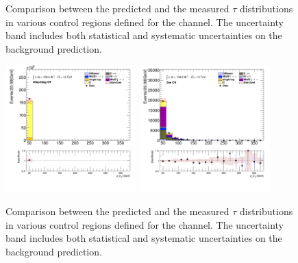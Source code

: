 \begin{figure}[!thp]
\begin{center}
			\end{center}
			\caption{
			Comparison between the predicted and the measured $\tau$ \pt distributions in various control regions defined for the \taulep channel. The uncertainty band includes both statistical and systematic uncertainties on the background prediction. 
			}
			\label{fig:bkg-tau-pt-taulep-1}
		\end{figure}

		\begin{figure}[!thp]
			\begin{center}    
			\includegraphics[width=0.45\textwidth]{chapters/chapter6_HPlus/images/taulep/tau_0_pt_DILEP_BTAG.png}
			\includegraphics[width=0.45\textwidth]{chapters/chapter6_HPlus/images/taulep/tau_0_pt_ZEE.png} \\
			\end{center}
			\caption{
			Comparison between the predicted and the measured $\tau$ \pt distributions in various control regions defined for the \taulep channel. The uncertainty band includes both statistical and systematic uncertainties on the background prediction. 
			}
			\label{fig:bkg-tau-pt-taulep-2}
		\end{figure}

